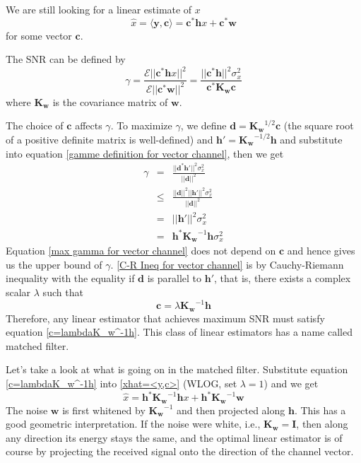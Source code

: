\documentclass[12pt]{article}
\theoremstyle{definition}
\begin{document}
We are still looking for a linear estimate of $x$
\begin{equation}
	\hat{x}=\langle \bm{y},\bm{c}\rangle=\bm{c}^*\bm{h}x+\bm{c}^*\bm{w}\label{xhat=<y,c>}
\end{equation}
for some vector $\bm{c}$.

The SNR can be defined by
\begin{equation}
\gamma = \frac{\mathcal{E}||\bm{c}^*\bm{h}x||^2}{\mathcal{E}||\bm{c}^*\bm{w}||^2}=\frac{||\bm{c}^*\bm{h}||^2\sigma_x^2}{\bm{c}^*\bm{K_w}\bm{c}}\label{gamme definition for vector channel}
\end{equation}
where $\bm{K_w}$ is the covariance matrix of $\bm{w}$.

The choice of $\bm{c}$ affects $\gamma$. To maximize $\gamma$, we define $\bm{d}=\bm{K_w}^{1/2}\bm{c}$ (the square root of a positive definite matrix is well-defined) and $\bm{h}'=\bm{K_w}^{-1/2}\bm{h}$ and substitute into equation \ref{gamme definition for vector channel}, then we get
\begin{eqnarray}
	\gamma&=&\frac{||\bm{d}^*\bm{h}'||^2\sigma_x^2}{||\bm{d}||^2}\nonumber\\
	&\leq&\frac{||\bm{d}||^2||\bm{h}'||^2\sigma_x^2}{||\bm{d}||^2}\label{C-R Ineq for vector channel}\\
	&=&||\bm{h}'||^2\sigma_x^2\nonumber\\
	&=&\bm{h}^*\bm{K_w}^{-1}\bm{h}\sigma_x^2\label{max gamma for vector channel}
\end{eqnarray}
Equation \ref{max gamma for vector channel} does not depend on $\bm{c}$ and hence gives us the upper bound of $\gamma$. \ref{C-R Ineq for vector channel} is by Cauchy-Riemann inequality with the equality if $\bm{d}$ is parallel to $\bm{h}'$, that is, there exists a complex scalar $\lambda$ such that
\begin{equation}
	\bm{c}=\lambda\bm{K_w}^{-1}\bm{h}\label{c=lambdaK_w^-1h}
\end{equation}
Therefore, any linear estimator that achieves maximum SNR must satisfy equation \ref{c=lambdaK_w^-1h}. This class of linear estimators has a name called matched filter.

Let's take a look at what is going on in the matched filter. Substitute equation \ref{c=lambdaK_w^-1h} into \ref{xhat=<y,c>} (WLOG, set $\lambda =1$) and we get
$$\hat{x} = \bm{h}^*\bm{K_w}^{-1}\bm{h}x+\bm{h}^*\bm{K_w}^{-1}\bm{w}$$
The noise $\bm{w}$ is first whitened by $\bm{K_w}^{-1}$ and then projected along $\bm{h}$. This has a good geometric interpretation. If the noise were white, i.e., $\bm{K_w}=\bm{I}$, then along any direction its energy stays the same, and the optimal linear estimator is of course by projecting the received signal onto the direction of the channel vector.
\end{document}
